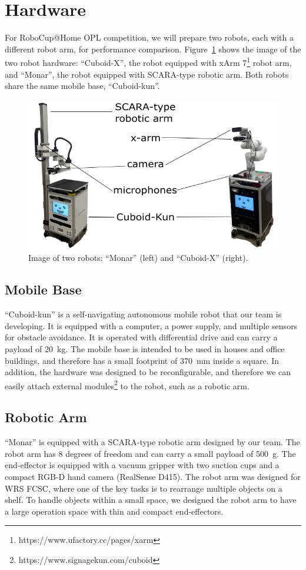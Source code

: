 \documentclass[runningheads,a4paper]{llncs}
\begin{document}
\section{Hardware}
For RoboCup@Home OPL competition, we will prepare two robots, each with a different robot arm, for performance comparison. Figure~\ref{fig:hardware} shows the image of the two robot hardware: ``Cuboid-X'', the robot equipped with xArm 7\footnote{https://www.ufactory.cc/pages/xarm} robot arm, and ``Monar'', the robot equipped with SCARA-type robotic arm. Both robots share the same mobile base, ``Cuboid-kun''.
\begin{figure}[tbp]
    \centering
    \includegraphics[width=0.5\linewidth]{images/Hardware.png}
    \caption{Image of two robots: ``Monar'' (left) and ``Cuboid-X'' (right).}
    \label{fig:hardware}
\end{figure}

\subsection{Mobile Base}
``Cuboid-kun'' is a self-navigating autonomous mobile robot that our team is developing. It is equipped with a computer, a power supply, and multiple sensors for obstacle avoidance. It is operated with differential drive and can carry a payload of 20~kg. The mobile base is intended to be used in houses and office buildings, and therefore has a small footprint of 370~mm inside a square. In addition, the hardware was designed to be reconfigurable, and therefore we can easily attach external modules\footnote{https://www.signagekun.com/cuboid} to the robot, such as a robotic arm.

\subsection{Robotic Arm}
``Monar'' is equipped with a SCARA-type robotic arm designed by our team. The robot arm has 8 degrees of freedom and can carry a small payload of 500~g. The end-effector is equipped with a vacuum gripper with two suction cups and a compact RGB-D hand camera (RealSense D415). The robot arm was designed for WRS FCSC, where one of the key tasks is to rearrange multiple objects on a shelf. To handle objects within a small space, we designed the robot arm to have a large operation space with thin and compact end-effectors.
\end{document}
